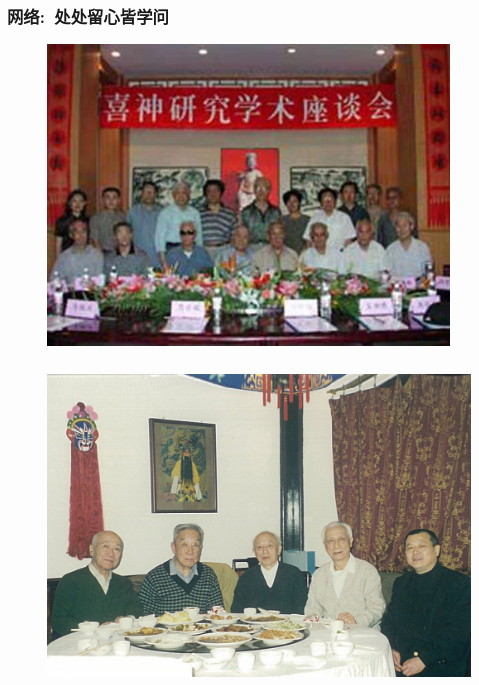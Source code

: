 \documentclass[cjk,slidestop,compress,mathserif,blue]{beamer}
\begin{document}
\frame
{
	\frametitle{网络:~处处留心皆学问}
\begin{minipage}{0.48\textwidth}
\begin{figure}[h!]
\centering
\vspace{-0.05in}
\includegraphics[height=0.70\textwidth,width=0.95\textwidth, clip]{Figures_Peking-Opera/PekOpe_Xi.jpg}
\label{Xishen}
\end{figure}
\end{minipage}
\begin{minipage}{0.50\textwidth}
\fontsize{4.5pt}{4.0pt}\selectfont{
}
\end{minipage}
}


\frame
{
	\frametitle{}
\begin{figure}[h!]
\centering
\includegraphics[height=0.60\textwidth,width=1.0\textwidth,viewport=0 0 500 300,clip]{Figures_Peking-Opera/Collect_Zhu-Liu-Wu-Wang.jpg}
\caption{\fontsize{7.3pt}{3.9pt}}
\label{Collect_Wang}
\end{figure}
}
\end{document}
